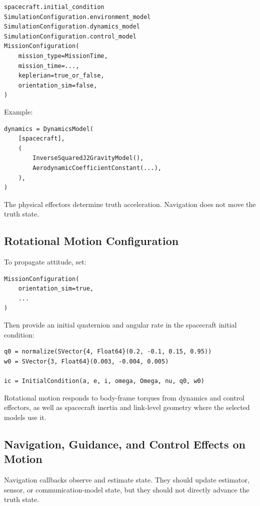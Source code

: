 \documentclass[11pt]{article}
\begin{document}
\begin{lstlisting}
spacecraft.initial_condition
SimulationConfiguration.environment_model
SimulationConfiguration.dynamics_model
SimulationConfiguration.control_model
MissionConfiguration(
    mission_type=MissionTime,
    mission_time=...,
    keplerian=true_or_false,
    orientation_sim=false,
)
\end{lstlisting}

Example:

\begin{lstlisting}
dynamics = DynamicsModel(
    [spacecraft],
    (
        InverseSquaredJ2GravityModel(),
        AerodynamicCoefficientConstant(...),
    ),
)
\end{lstlisting}

The physical effectors determine truth acceleration. Navigation does not move
the truth state.

\subsection{Rotational Motion Configuration}

To propagate attitude, set:

\begin{lstlisting}
MissionConfiguration(
    orientation_sim=true,
    ...
)
\end{lstlisting}

Then provide an initial quaternion and angular rate in the spacecraft initial
condition:

\begin{lstlisting}
q0 = normalize(SVector{4, Float64}(0.2, -0.1, 0.15, 0.95))
w0 = SVector{3, Float64}(0.003, -0.004, 0.005)

ic = InitialCondition(a, e, i, omega, Omega, nu, q0, w0)
\end{lstlisting}

Rotational motion responds to body-frame torques from dynamics and control
effectors, as well as spacecraft inertia and link-level geometry where the
selected models use it.

\subsection{Navigation, Guidance, and Control Effects on Motion}

Navigation callbacks observe and estimate state. They should update estimator,
sensor, or communication-model state, but they should not directly advance the
truth state.
\end{document}
